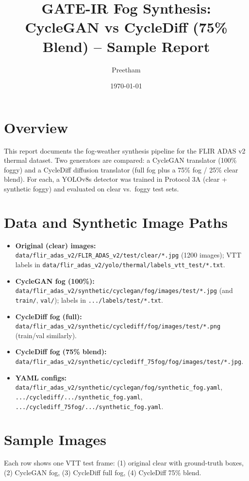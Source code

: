 \documentclass[11pt]{article}
\title{GATE-IR Fog Synthesis: CycleGAN vs CycleDiff (75\% Blend) -- Sample Report}
\author{Preetham}
\date{\today}
\begin{document}
\maketitle

\section{Overview}
This report documents the fog-weather synthesis pipeline for the FLIR ADAS v2 thermal dataset.
Two generators are compared: a CycleGAN translator (100\% foggy) and a CycleDiff diffusion
translator (full fog plus a 75\% fog / 25\% clear blend). For each, a YOLOv8s detector was
trained in Protocol 3A (clear + synthetic foggy) and evaluated on clear vs.\ foggy test sets.

\section{Data and Synthetic Image Paths}
\begin{itemize}
  \item \textbf{Original (clear) images:} \texttt{data/flir\_adas\_v2/FLIR\_ADAS\_v2/test/clear/*.jpg} (1200 images); VTT labels in \texttt{data/flir\_adas\_v2/yolo/thermal/labels\_vtt\_test/*.txt}.
  \item \textbf{CycleGAN fog (100\%):} \texttt{data/flir\_adas\_v2/synthetic/cyclegan/fog/images/test/*.jpg} (and \texttt{train/}, \texttt{val/}); labels in \texttt{.../labels/test/*.txt}.
  \item \textbf{CycleDiff fog (full):} \texttt{data/flir\_adas\_v2/synthetic/cyclediff/fog/images/test/*.png} (train/val similarly).
  \item \textbf{CycleDiff fog (75\% blend):} \texttt{data/flir\_adas\_v2/synthetic/cyclediff\_75fog/fog/images/test/*.jpg}.
  \item \textbf{YAML configs:} \texttt{data/flir\_adas\_v2/synthetic/cyclegan/fog/synthetic\_fog.yaml}, \texttt{.../cyclediff/.../synthetic\_fog.yaml}, \texttt{.../cyclediff\_75fog/.../synthetic\_fog.yaml}.
\end{itemize}

\section{Sample Images}
Each row shows one VTT test frame: (1) original clear with ground-truth boxes, (2) CycleGAN fog,
(3) CycleDiff full fog, (4) CycleDiff 75\% blend.
\end{document}

